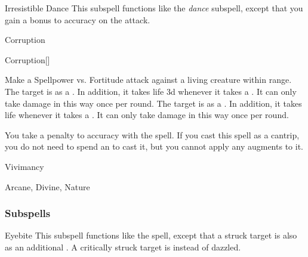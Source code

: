 \begin{ability}[\nth{9}]{Irresistible Dance}
This subspell functions like the \textit{dance} subspell, except that you gain a  bonus to accuracy on the attack.
\end{ability}
\vspace{0.25em}

\newpage
\begin{spellsection}{Corruption}

\begin{spellheader}
\end{spellheader}


\begin{ability}{Corruption}[]

Make a Spellpower vs. Fortitude attack against a living creature within \rngclose range.
\hit The target is  as a .
In addition, it takes life  \minus3d whenever it takes a .
It can only take damage in this way once per round.
\crit The target is  as a .
In addition, it takes life  whenever it takes a .
It can only take damage in this way once per round.

\end{ability}



You take a  penalty to accuracy with the spell.
If you cast this spell as a cantrip,
you do not need to spend an  to cast it,
but you cannot apply any augments to it.


 Vivimancy

 Arcane, Divine, Nature
\end{spellsection}


\subsubsection{Subspells}


\begin{ability}[\nth{2}]{Eyebite}
This subspell functions like the  spell, except that a struck target is also  as an additional .
A critically struck target is  instead of dazzled.
\end{ability}
\vspace{0.25em}


